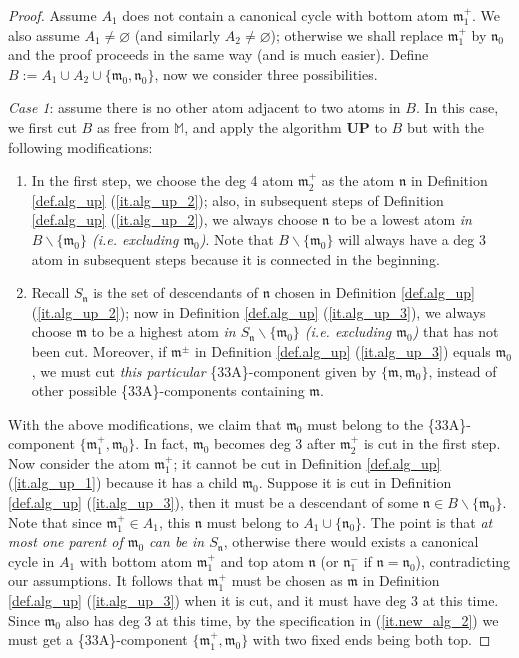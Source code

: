 \documentclass[10pt, reqno]{amsart}
\newcommand{\Mb}{\mathbb M}
\newcommand{\mf}{\mathfrak m}
\newcommand{\nf}{\mathfrak n}
\theoremstyle{definition}
\theoremstyle{remark}
\numberwithin{equation}{section}
\begin{document}
\begin{proof} Assume $A_1$ does not contain a canonical cycle with bottom atom $\mf_1^+$. We also assume $A_1\neq \varnothing$ (and similarly $A_2\neq\varnothing$); otherwise we shall replace $\mf_1^+$ by $\nf_0$ and the proof proceeds in the same way (and is much easier). Define $B:=A_1\cup A_2\cup\{\mf_0,\nf_0\}$, now we consider three possibilities.

\emph{Case 1}: assume there is no other atom adjacent to two atoms in $B$. In this case, we first cut $B$ as free from $\Mb$, and apply the algorithm \textbf{UP} to $B$ but with the following modifications:
\begin{enumerate}
\item\label{it.new_alg_1} In the first step, we choose the deg 4 atom $\mf_2^+$ as the atom $\nf$ in Definition \ref{def.alg_up} (\ref{it.alg_up_2}); also, in subsequent steps of Definition \ref{def.alg_up} (\ref{it.alg_up_2}), we always choose $\nf$ to be a lowest atom \emph{in $B\backslash\{\mf_0\}$ (i.e. excluding $\mf_0$)}. Note that $B\backslash\{\mf_0\}$ will always have a deg 3 atom in subsequent steps because it is connected in the beginning.
\item\label{it.new_alg_2} Recall $S_\nf$ is the set of descendants of $\nf$ chosen in Definition \ref{def.alg_up} (\ref{it.alg_up_2}); now in Definition \ref{def.alg_up} (\ref{it.alg_up_3}), we always choose $\mf$ to be a highest atom \emph{in $S_\nf\backslash\{\mf_0\}$ (i.e. excluding $\mf_0$)} that has not been cut. Moreover, if $\mf^\pm$ in Definition \ref{def.alg_up} (\ref{it.alg_up_3}) equals $\mf_0$, we must cut \emph{this particular} \{33A\}-component given by $\{\mf,\mf_0\}$, instead of other possible \{33A\}-components containing $\mf$.
\end{enumerate}

With the above modifications, we claim that $\mf_0$ must belong to the \{33A\}-component $\{\mf_1^+,\mf_0\}$. In fact, $\mf_0$ becomes deg 3 after $\mf_2^+$ is cut in the first step. Now consider the atom $\mf_1^+$; it cannot be cut in Definition \ref{def.alg_up} (\ref{it.alg_up_1}) because it has a child $\mf_0$. Suppose it is cut in Definition \ref{def.alg_up} (\ref{it.alg_up_3}), then it must be a descendant of some $\nf\in B\backslash\{\mf_0\}$. Note that since $\mf_1^+\in A_1$, this $\nf$ must belong to $A_1\cup\{\nf_0\}$. The point is that \emph{at most one parent of $\mf_0$ can be in $S_\nf$}, otherwise there would exists a canonical cycle in $A_1$ with bottom atom $\mf_1^+$ and top atom $\nf$ (or $\nf_1^-$ if $\nf=\nf_0$), contradicting our assumptions. It follows that $\mf_1^+$ must be chosen as $\mf$ in Definition \ref{def.alg_up} (\ref{it.alg_up_3}) when it is cut, and it must have deg 3 at this time. Since $\mf_0$ also has deg 3 at this time, by the specification in (\ref{it.new_alg_2}) we must get a \{33A\}-component $\{\mf_1^+,\mf_0\}$ with two fixed ends being both top.


\end{proof}
\end{document}
